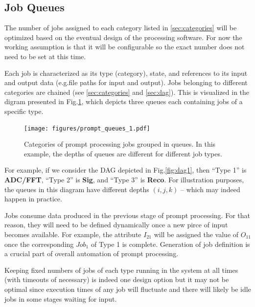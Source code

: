 \documentclass[pdftex,12pt,letter]{article}
\begin{document}
\subsection{Job Queues}
The number of jobs assigned to each category listed in \ref{sec:categories} will be optimized based
on the eventual design of the processing software. For now the working assumption is that it will
be configurable so the exact number does not need to be set at this time.

Each job is characterized as its type (category), state, and references to its input and output data
(e.g.file paths for input and output). Jobs belonging to different categories are chained (see \ref{sec:categories} and \ref{sec:dag}). This is
visualized in the digram presented in Fig.\ref{fig:queues1}, which depicts three queues each containing
jobs of a specific type.

\begin{figure}[tbh]
  \centering
  \texttt{[image: figures/prompt\_queues\_1.pdf]}
  \caption{Categories of prompt processing jobs grouped in queues. In this example, the depths of queues are different for different job types.}
  \label{fig:queues1}
\end{figure}

For example, if we consider the DAG depicted in Fig.\ref{fig:dag1}, then ``Type 1''
is \textbf{ADC/FFT}, ``Type 2'' is \textbf{Sig}, and ``Type 3'' is \textbf{Reco}. For illustration purposes,
the queues in this diagram have different depths $(i,j,k)$  -- which may indeed happen in practice.

Jobs consume data produced in the previous stage of prompt processing. For that reason, they
will need to be defined dynamically once a new pirce of input becomes available. For example,
the attribute $I_{21}$ will be assigned the value of $O_{11}$ once the corresponding $Job_1$ of Type 1
is complete. Generation of job definition is a crucial part of overall automation of prompt processing.

Keeping fixed numbers of jobs of each type running in the system at all times (with timeouts of necessary)
is indeed one design option but it may not be optimal since execution times of any job will fluctuate and there
will likely be idle jobs in some stages waiting for input.
\end{document}
